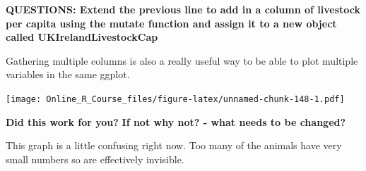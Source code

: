 \documentclass[]{book}
\newenvironment{Shaded}{\begin{snugshade}}{\end{snugshade}}
\newcommand{\DataTypeTok}[1]{\textcolor[rgb]{0.13,0.29,0.53}{#1}}
\newcommand{\KeywordTok}[1]{\textcolor[rgb]{0.13,0.29,0.53}{\textbf{#1}}}
\newcommand{\NormalTok}[1]{#1}
\newcommand{\OperatorTok}[1]{\textcolor[rgb]{0.81,0.36,0.00}{\textbf{#1}}}
\newcommand{\OtherTok}[1]{\textcolor[rgb]{0.56,0.35,0.01}{#1}}
\newcommand{\StringTok}[1]{\textcolor[rgb]{0.31,0.60,0.02}{#1}}
\begin{document}
\begin{Shaded}
\end{Shaded}

\textbf{QUESTIONS: Extend the previous line to add in a column of livestock per capita using the mutate function and assign it to a new object called UKIrelandLivestockCap}

\begin{Shaded}
\end{Shaded}

Gathering multiple columns is also a really useful way to be able to plot multiple variables in the same ggplot.

\begin{Shaded}
\end{Shaded}

\texttt{[image: Online\_R\_Course\_files/figure-latex/unnamed-chunk-148-1.pdf]}

\textbf{Did this work for you?}
\textbf{If not why not? - what needs to be changed?}

This graph is a little confusing right now. Too many of the animals have very small numbers so are effectively invisible.
\end{document}
